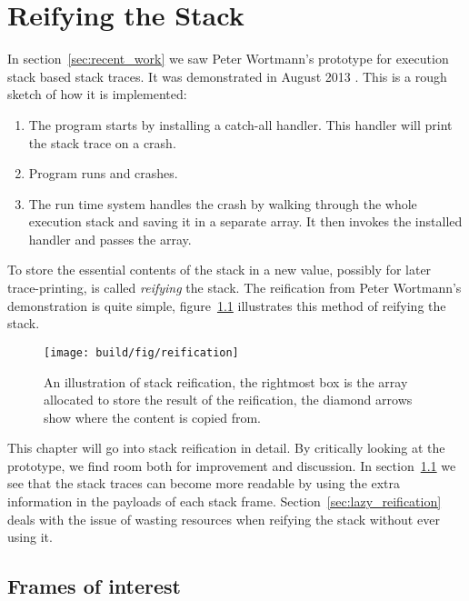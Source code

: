 \chapter{Reifying the Stack} \label{chp:reifying_the_stack}

In section~\ref{sec:recent_work} we saw Peter Wortmann's prototype for
execution stack based stack traces. It was demonstrated in August
2013 \cite{stack_traces_ticket}. This is a rough sketch of how it is
implemented:

\begin{enumerate}
  \item
    The program starts by installing a catch-all handler. This handler will
    print the stack trace on a crash.
  \item
    Program runs and crashes.
  \item
    The run time system handles the crash by walking through the whole
    execution stack and saving it in a separate array. It then invokes the
    installed handler and passes the array.
\end{enumerate}

To store the essential contents of the stack in a new value,
possibly for later trace-printing, is called \emph{reifying} the
stack. The reification from Peter Wortmann's demonstration is
quite simple, figure~\ref{fig:reification} illustrates
this method of reifying the stack.

\begin{figure}
\begin{mdframed}
  \texttt{[image: build/fig/reification]}
  \caption{An illustration of stack reification, the rightmost box is the array
    allocated to store the result of the reification, the diamond arrows show
    where the content is copied from.}
  \label{fig:reification}
\end{mdframed}
\end{figure}

This chapter will go into
stack reification in detail. By critically looking
at the prototype, we find room both for improvement and discussion.
In section~\ref{sec:frames_of_interest} we see that the stack traces can become more
readable by using the extra information in the payloads of each stack
frame. Section~\ref{sec:lazy_reification} deals with the issue of wasting
resources when reifying the stack without ever using it.

\section{Frames of interest} \label{sec:frames_of_interest}

